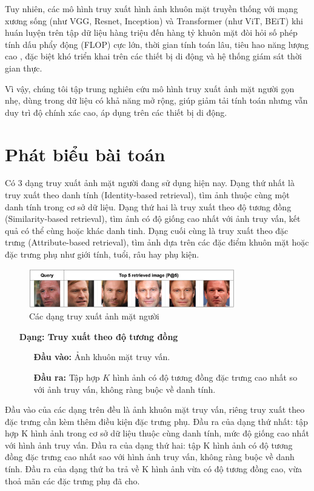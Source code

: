 Tuy nhiên, các mô hình truy xuất hình ảnh khuôn mặt truyền thống với mạng xương sống (như VGG, Resnet, Inception) và Transformer (như ViT, BEiT) khi huán luyện trên tập dữ liệu hàng triệu đến hàng tỷ khuôn mặt đòi hỏi số phép tính dấu phẩy động (FLOP) cực lớn, thời gian tính toán lâu, tiêu hao năng lượng cao \cite{yang2025hiddenjoules}, đặc biệt khó triển khai trên các thiết bị di động và hệ thống giám sát thời gian thực. 

Vì vậy, chúng tôi tập trung nghiên cứu mô hình truy xuất ảnh mặt người gọn nhẹ, dùng trong dữ liệu có khả năng mở rộng, giúp giảm tải tính toán nhưng vẫn duy trì độ chính xác cao, áp dụng trên các thiết bị di động. 

\section{Phát biểu bài toán}
Có 3 dạng truy xuất ảnh mặt người đang sử dụng hiện nay. Dạng thứ nhất là truy xuất theo danh tính (Identity-based retrieval), tìm ảnh thuộc cùng một danh tính trong cơ sở dữ liệu. Dạng thứ hai là truy xuất theo độ tương đồng (Similarity-based retrieval), tìm ảnh có độ giống cao nhất với ảnh truy vấn, kết quả có thể cùng hoặc khác danh tinh. Dạng cuối cùng là truy xuất theo đặc trưng (Attribute-based retrieval), tìm ảnh dựa trên các đặc điểm khuôn mặt hoặc đặc trưng phụ như giới tính, tuổi, râu hay phụ kiện.

\begin{figure}[htbp] %
    \centering
    \includegraphics[width=0.8\textwidth]{images/face_retrieval_types.png} 
    \caption{Các dạng truy xuất ảnh mặt người}
    \label{fig:face_retrieval_types}
\end{figure}

\begin{itemize}
    \item[\textbf{Dạng: Truy xuất theo độ tương đồng }]
        \begin{itemize}
            \item[\textbf{Đầu vào:}] Ảnh khuôn mặt truy vấn.
            \item[\textbf{Đầu ra:}] Tập hợp \( K \) hình ảnh có độ tương đồng đặc trưng cao nhất so với ảnh truy vấn, không ràng buộc về danh tính.
        \end{itemize}
\end{itemize}
Đầu vào của các dạng trên đều là ảnh khuôn mặt truy vấn, riêng truy xuất theo đặc trưng cần kèm thêm điều kiện đặc trưng phụ. Đầu ra của dạng thứ nhất: tập hợp K hình ảnh trong cơ sở dữ liệu thuộc cùng danh tính, mức độ giống cao nhất với hình ảnh truy vấn. Đầu ra của dạng thứ hai: tập K hình ảnh có độ tương đồng đặc trưng cao nhất sao với hình ảnh truy vấn, không ràng buộc về danh tính. Đầu ra của dạng thứ ba trả về K hình ảnh vừa có độ tương đồng cao, vừa thoả mãn các đặc trưng phụ đã cho.


